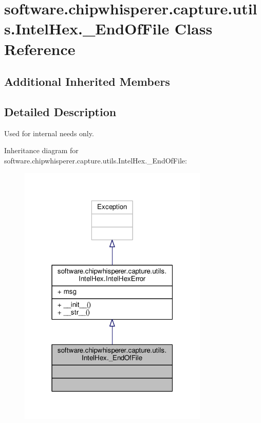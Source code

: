 \hypertarget{classsoftware_1_1chipwhisperer_1_1capture_1_1utils_1_1IntelHex_1_1__EndOfFile}{}\section{software.\+chipwhisperer.\+capture.\+utils.\+Intel\+Hex.\+\_\+\+End\+Of\+File Class Reference}
\label{classsoftware_1_1chipwhisperer_1_1capture_1_1utils_1_1IntelHex_1_1__EndOfFile}
\subsection*{Additional Inherited Members}


\subsection{Detailed Description}
\begin{DoxyVerb}Used for internal needs only.\end{DoxyVerb}
 

Inheritance diagram for software.\+chipwhisperer.\+capture.\+utils.\+Intel\+Hex.\+\_\+\+End\+Of\+File\+:\nopagebreak
\begin{figure}[H]
\begin{center}
\leavevmode
\includegraphics[width=256pt]{d4/dd5/classsoftware_1_1chipwhisperer_1_1capture_1_1utils_1_1IntelHex_1_1__EndOfFile__inherit__graph}
\end{center}
\end{figure}


